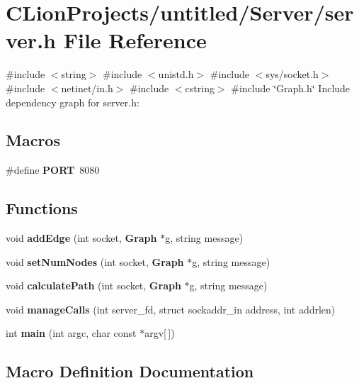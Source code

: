 \section{C\+Lion\+Projects/untitled/\+Server/server.h File Reference}
\label{server_8h}
{\ttfamily \#include $<$string$>$}\newline
{\ttfamily \#include $<$unistd.\+h$>$}\newline
{\ttfamily \#include $<$sys/socket.\+h$>$}\newline
{\ttfamily \#include $<$netinet/in.\+h$>$}\newline
{\ttfamily \#include $<$cstring$>$}\newline
{\ttfamily \#include \char`\"{}Graph.\+h\char`\"{}}\newline
Include dependency graph for server.\+h\+:
\subsection*{Macros}
\begin{DoxyCompactItemize}
\item 
\#define \textbf{ P\+O\+RT}~8080
\end{DoxyCompactItemize}
\subsection*{Functions}
\begin{DoxyCompactItemize}
\item 
void \textbf{ add\+Edge} (int socket, \textbf{ Graph} $\ast$g, string message)
\item 
void \textbf{ set\+Num\+Nodes} (int socket, \textbf{ Graph} $\ast$g, string message)
\item 
void \textbf{ calculate\+Path} (int socket, \textbf{ Graph} $\ast$g, string message)
\item 
void \textbf{ manage\+Calls} (int server\+\_\+fd, struct sockaddr\+\_\+in address, int addrlen)
\item 
int \textbf{ main} (int argc, char const $\ast$argv[$\,$])
\end{DoxyCompactItemize}


\subsection{Macro Definition Documentation}
\mbox{\label{server_8h_a614217d263be1fb1a5f76e2ff7be19a2}} 
